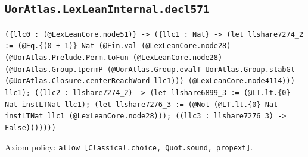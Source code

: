 \documentclass[11pt]{article}
\begin{document}
\subsection*{\texttt{UorAtlas.LexLeanInternal.decl571}}
\noindent\texttt{(\{llc0 : (@LexLeanCore.node51)\} -> (\{llc1 : Nat\} -> (let llshare7274\_2 := (@Eq.\{(0 + 1)\} Nat (@Fin.val (@LexLeanCore.node28) (@UorAtlas.Prelude.Perm.toFun (@LexLeanCore.node28) (@UorAtlas.Group.tpermP (@UorAtlas.Group.evalT UorAtlas.Group.stabGt (@UorAtlas.Closure.centerReachWord llc1))) (@LexLeanCore.node4114))) llc1); ((llc2 : llshare7274\_2) -> (let llshare6899\_3 := (@LT.lt.\{0\} Nat instLTNat llc1); (let llshare7276\_3 := (@Not (@LT.lt.\{0\} Nat instLTNat llc1 (@LexLeanCore.node28))); ((llc3 : llshare7276\_3) -> False)))))))}\par
\noindent Axiom policy: \texttt{allow [Classical.choice, Quot.sound, propext]}.\par
\end{document}
